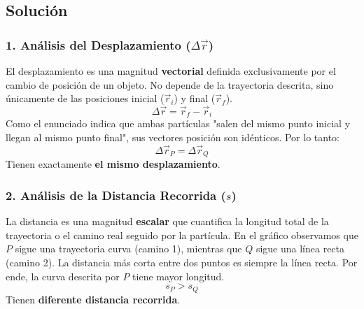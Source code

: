 \documentclass[12pt, a4paper]{article}
\begin{document}
\begin{center}
\end{center}

\subsection*{Solución}

\subsubsection*{1. Análisis del Desplazamiento ($\Delta\vec{r}$)}
El desplazamiento es una magnitud \textbf{vectorial} definida exclusivamente por el cambio de posición de un objeto. No depende de la trayectoria descrita, sino únicamente de las posiciones inicial ($\vec{r}_i$) y final ($\vec{r}_f$).
$$ \Delta\vec{r} = \vec{r}_f - \vec{r}_i $$
Como el enunciado indica que ambas partículas "salen del mismo punto inicial y llegan al mismo punto final", sus vectores posición son idénticos.
Por lo tanto:
$$ \Delta\vec{r}_P = \Delta\vec{r}_Q $$
Tienen exactamente \textbf{el mismo desplazamiento}.

\subsubsection*{2. Análisis de la Distancia Recorrida ($s$)}
La distancia es una magnitud \textbf{escalar} que cuantifica la longitud total de la trayectoria o el camino real seguido por la partícula.
En el gráfico observamos que $P$ sigue una trayectoria curva (camino 1), mientras que $Q$ sigue una línea recta (camino 2). La distancia más corta entre dos puntos es siempre la línea recta. Por ende, la curva descrita por $P$ tiene mayor longitud.
$$ s_P > s_Q $$
Tienen \textbf{diferente distancia recorrida}.
\end{document}
